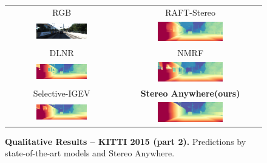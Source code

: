 \documentclass[10pt,twocolumn,letterpaper]{article}
\newcommand{\method}[0]{Stereo Anywhere\xspace}
\begin{document}
\begin{figure}[h]
\begin{tabular}{cc}
        \small RGB &
        \small RAFT-Stereo \cite{lipson2021raft} \\
        \includegraphics[width=0.48\textwidth]{imgs/KITTI/rgb/144.jpg} &
        \includegraphics[width=0.48\textwidth]{imgs/KITTI/stereo/RAFT-Stereo/144.jpg} \\
        \small DLNR \cite{zhao2023high} &
        \small NMRF \cite{guan2024neural} \\
        \includegraphics[width=0.48\textwidth]{imgs/KITTI/stereo/DLNR/144.jpg} &
        \includegraphics[width=0.48\textwidth]{imgs/KITTI/stereo/NMRF/144.jpg} \\
        \small Selective-IGEV \cite{wang2024selective} &
        \textbf{\method (ours)} \\
        \includegraphics[width=0.48\textwidth]{imgs/KITTI/stereo/Selective/144.jpg} &
        \includegraphics[width=0.48\textwidth]{imgs/KITTI/stereo/Ours/144.jpg} \\
    \end{tabular}\vspace{-0.3cm}
    \caption{\textbf{Qualitative Results -- KITTI 2015 (part 2).} Predictions by state-of-the-art models and \method.}
    \label{fig:qual_kitti15_2}\vspace{-0.3cm}
\end{figure}
\end{document}
